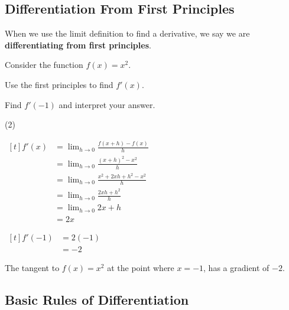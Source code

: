 \documentclass[11pt,a4paper]{book}
\begin{document}
\subsection{Differentiation From First Principles}

When we use the limit definition to find a derivative, we say we are
\textbf{differentiating from first principles}.


\newpage{}


\begin{example}

Consider the function $f\left(x\right)=x^{2}$.

\begin{tasks}[label=(\alph*),label-width=3.5ex]

\task  Use the first principles to find $f'\left(x\right)$.

\task  Find $f'\left(-1\right)$ and interpret your answer.

\end{tasks}

\Solution

\begin{tasks}[label=(\alph*),label-width=3.5ex](2)

\task
$
\begin{aligned}[t]
f'\left(x\right) & =\lim_{h\rightarrow0}\frac{f(x+h)-f(x)}{h}\\
 & =\lim_{h\rightarrow0}\frac{\left(x+h\right)^{2}-x^{2}}{h}\\
 & =\lim_{h\rightarrow0}\frac{x^{2}+2xh+h^{2}-x^{2}}{h}\\
 & =\lim_{h\rightarrow0}\frac{2xh+h^{2}}{h}\\
 & =\lim_{h\rightarrow0}2x+h\\
 & =2x
\end{aligned}
$

\task
$
\begin{aligned}[t]
f'\left(-1\right) & =2\left(-1\right)\\
 & =-2
\end{aligned}
$

The tangent to $f\left(x\right)=x^{2}$ at the point where $x=-1$,
has a gradient of $-2$.

\end{tasks}

\end{example}

\subsection{Basic Rules of Differentiation}
\end{document}
